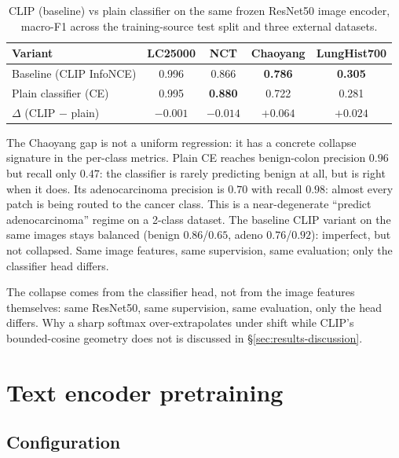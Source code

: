 \begin{table}[ht]
    \centering
    \small
    \begin{tabular}{|l|c|c|c|c|}
    \hline
    \textbf{Variant} & \textbf{LC25000} & \textbf{NCT} & \textbf{Chaoyang} & \textbf{LungHist700} \\ \hline
    Baseline (CLIP InfoNCE)   & 0.996 & 0.866          & \textbf{0.786} & \textbf{0.305} \\ \hline
    Plain classifier (CE)     & 0.995 & \textbf{0.880} & 0.722          & 0.281 \\ \hline
    $\Delta$ (CLIP $-$ plain) & $-0.001$ & $-0.014$ & $+0.064$ & $+0.024$ \\ \hline
    \end{tabular}
    \caption{CLIP (baseline) vs plain classifier on the same frozen ResNet50 image encoder, macro-F1 across the training-source test split and three external datasets.}
    \label{tab:clip-vs-plain}
\end{table}

The Chaoyang gap is not a uniform regression: it has a concrete collapse signature in the per-class metrics. Plain CE reaches benign-colon precision $0.96$ but recall only $0.47$: the classifier is rarely predicting benign at all, but is right when it does. Its adenocarcinoma precision is $0.70$ with recall $0.98$: almost every patch is being routed to the cancer class. This is a near-degenerate ``predict adenocarcinoma'' regime on a 2-class dataset. The baseline CLIP variant on the same images stays balanced (benign $0.86$/$0.65$, adeno $0.76$/$0.92$): imperfect, but not collapsed. Same image features, same supervision, same evaluation; only the classifier head differs.

The collapse comes from the classifier head, not from the image features themselves: same ResNet50, same supervision, same evaluation, only the head differs. Why a sharp softmax over-extrapolates under shift while CLIP's bounded-cosine geometry does not is discussed in §\ref{sec:results-discussion}.


\section{Text encoder pretraining}
\label{sec:results-text-encoder}

\subsection{Configuration}

